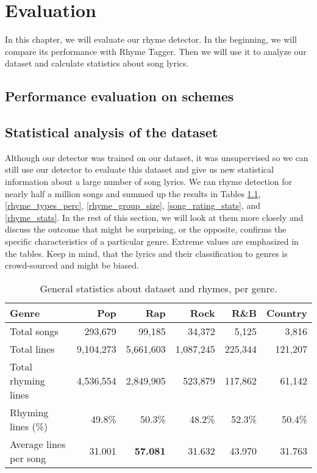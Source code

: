 \chapter{Evaluation}\label{evaluation}
In this chapter, we will evaluate our rhyme detector. In the beginning, we will compare its performance with Rhyme Tagger. Then we will use it to analyze our dataset and calculate statistics about song lyrics.

\section{Performance evaluation on schemes}

\section{Statistical analysis of the dataset}
Although our detector was trained on our dataset, it was unsupervised so we can still use our detector to evaluate this dataset and give us new statistical information about a large number of song lyrics. We ran rhyme detection for nearly half a million songs and summed up the results in Tables \ref{rhyme_line_stats}, \ref{rhyme_types_perc}, \ref{rhyme_group_size}, \ref{song_rating_stats}, and \ref{rhyme_stats}. In the rest of this section, we will look at them more closely and discuss the outcome that might be surprising, or the opposite, confirms the specific  characteristics of a particular genre. Extreme values are emphasized in the tables. Keep in mind, that the lyrics and their classification to genres is crowd-sourced and might be biased.
\begin{table}[h!]
	\centering
	\begin{tabular}{l | r r r r r} 	
		Genre & 			Pop & 		Rap & 		Rock & 		R\&B & 		Country\\ 
		\midrule
		 Total songs& 293,679 & 99,185& 34,372& 5,125& 3,816 \\
		Total lines& 9,104,273 &5,661,603& 1,087,245& 225,344& 121,207 \\ 
		Total rhyming lines& 4,536,554& 2,849,905& 523,879& 117,862& 61,142 \\ 
		 Rhyming lines (\%) & 49.8\%& 50.3\%& 48.2\%& 52.3\%& 50.4\%  \\
		 Average lines per song & 31.001 & \textbf{57.081} & 31.632 & 43.970 & 31.763  \\

	\end{tabular}
	\caption{General statistics about dataset and rhymes, per genre.} 
	\label{rhyme_line_stats}
\end{table}

